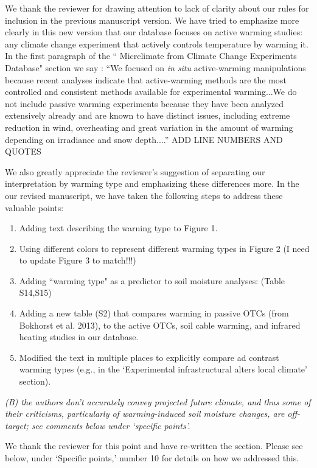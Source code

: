 \documentclass[11pt,a4paper]{letter}
\begin{document}
\begin{letter}{}
\par We thank the reviewer for drawing attention to lack of clarity about our rules for inclusion in the previous manuscript version. We have tried to emphasize more clearly in this new version that our database focuses on active warming studies: any climate change experiment that actively controls temperature by warming it. In the first paragraph of the `` Micrclimate from Climate Change Experiments Database" section we say : ``We focused on \textit{in situ} active-warming manipulations because recent analyses indicate that active-warming methods are the most controlled and consistent methods available for experimental warming...We do not include passive warming experiments because they have been analyzed extensively already and are known to have distinct issues, including extreme reduction in wind, overheating and great variation in the amount of warming depending on irradiance and snow depth....''  ADD LINE NUMBERS AND QUOTES
\par We also greatly appreciate the reviewer's suggestion of separating our interpretation by warming type and emphasizing these differences more. In the our revised manuscript, we have taken the following steps to address these valuable points:
\begin{enumerate}
\item Adding text describing the warning type to Figure 1.
\item Using different colors  to represent different warming types in Figure 2 (I need to update Figure 3 to match!!!)
\item Adding ``warming type" as a predictor to soil moisture analyses: (Table S14,S15)
\item Adding a new table (S2) that compares warming in passive OTCs (from Bokhorst et al. 2013), to the active OTCs, soil cable warming, and infrared heating studies in our database.
\item Modified the text in multiple places to explicitly compare ad contrast warming types (e.g., in the `Experimental infrastructural alters local climate' section). 
\end{enumerate}


\par \emph{(B) the authors don't accurately convey projected future climate, and thus some of their criticisms, particularly of warming-induced soil moisture changes, are off-target; see comments below under `specific points'.}

\par We thank the reviewer for this point and have re-written the section. Please see below, under `Specific points,' number 10 for details on how we addressed this. 


\end{letter}
\end{document}

